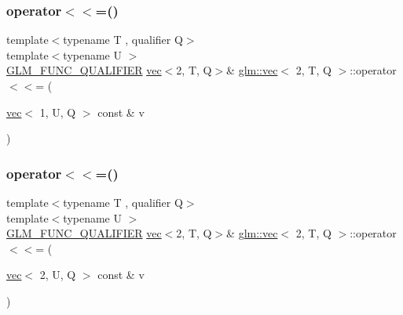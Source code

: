 \subsubsection{\texorpdfstring{operator$<$$<$=()}{operator<<=()}\hspace{0.1cm}{\footnotesize\ttfamily [5/6]}}
{\footnotesize\ttfamily template$<$typename T , qualifier Q$>$ \\
template$<$typename U $>$ \\
\mbox{\hyperlink{setup_8hpp_a33fdea6f91c5f834105f7415e2a64407}{G\+L\+M\+\_\+\+F\+U\+N\+C\+\_\+\+Q\+U\+A\+L\+I\+F\+I\+ER}} \mbox{\hyperlink{structglm_1_1vec}{vec}}$<$2, T, Q$>$\& \mbox{\hyperlink{structglm_1_1vec}{glm\+::vec}}$<$ 2, T, Q $>$\+::operator$<$$<$= (\begin{DoxyParamCaption}\item[{\mbox{\hyperlink{structglm_1_1vec}{vec}}$<$ 1, U, Q $>$ const \&}]{v }\end{DoxyParamCaption})}

\mbox{\label{structglm_1_1vec_3_012_00_01_t_00_01_q_01_4_a3bbdd09fd3976b858078dc1157cecf19}} 
\subsubsection{\texorpdfstring{operator$<$$<$=()}{operator<<=()}\hspace{0.1cm}{\footnotesize\ttfamily [6/6]}}
{\footnotesize\ttfamily template$<$typename T , qualifier Q$>$ \\
template$<$typename U $>$ \\
\mbox{\hyperlink{setup_8hpp_a33fdea6f91c5f834105f7415e2a64407}{G\+L\+M\+\_\+\+F\+U\+N\+C\+\_\+\+Q\+U\+A\+L\+I\+F\+I\+ER}} \mbox{\hyperlink{structglm_1_1vec}{vec}}$<$2, T, Q$>$\& \mbox{\hyperlink{structglm_1_1vec}{glm\+::vec}}$<$ 2, T, Q $>$\+::operator$<$$<$= (\begin{DoxyParamCaption}\item[{\mbox{\hyperlink{structglm_1_1vec}{vec}}$<$ 2, U, Q $>$ const \&}]{v }\end{DoxyParamCaption})}

\mbox{\label{structglm_1_1vec_3_012_00_01_t_00_01_q_01_4_a9bd00e17d1fda738c0e07b652e39e7f6}} 
